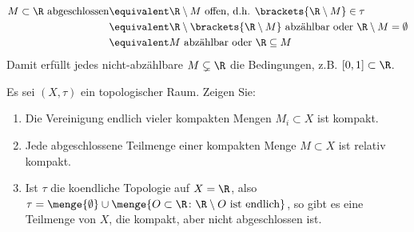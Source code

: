 \begin{exercisePage}
\begin{enumerate}[leftmargin=\zulength, label=(zu \alph*)]
\begin{equation*}
			\begin{aligned}
			M \subset \R \text{ abgeschlossen} 
			&\equivalent \R \setminus M \text{ offen, d.h. } \brackets{\R \setminus M} \in \tau \\
			&\equivalent \R \setminus \brackets{\R \setminus M} \text{ abzählbar oder } \R \setminus M = \emptyset \\
			&\equivalent M \text{ abzählbar oder } \R \subseteq M
			\end{aligned}
		\end{equation*}
		Damit erfüllt jedes nicht-abzählbare $M \subsetneq \R$ die Bedingungen, z.B. $[0,1] \subset \R$.
	\end{enumerate}

	\begin{exercise}
		Es sei $(X,\tau)$ ein topologischer Raum. Zeigen Sie:
		\begin{enumerate}[leftmargin=*, label=(\alph*)]
			\item Die Vereinigung endlich vieler kompakten Mengen $M_i \subset X$ ist kompakt.
			\item Jede abgeschlossene Teilmenge einer kompakten Menge $M \subset X$ ist relativ kompakt.
			\item Ist $\tau$ die koendliche Topologie auf $X=\R$, also $\tau = \menge{\emptyset} \cup \menge{O \subset \R \colon \R \setminus O \text{ ist endlich}}$, so gibt es eine Teilmenge von $X$, die kompakt, aber nicht abgeschlossen ist.
		\end{enumerate}
	\end{exercise}


\end{exercisePage}
